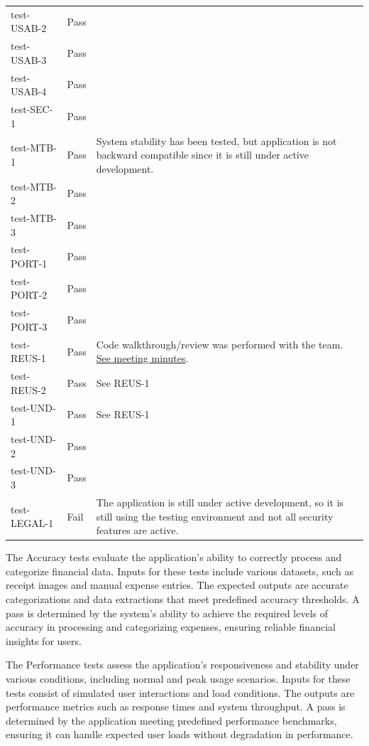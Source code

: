 \documentclass[12pt, titlepage]{article}
\begin{document}
\begin{longtable}{>{\centering\arraybackslash}p{} >{\centering\arraybackslash}p{} >{\centering\arraybackslash}p{}}
    test-USAB-2 & Pass &  \\
    test-USAB-3 & Pass &  \\
    test-USAB-4 & Pass &  \\
    \midrule
    test-SEC-1 & Pass &  \\
    \midrule
    test-MTB-1 & Pass & System stability has been tested, but application is not
    backward compatible since it is still under active development. \\
    test-MTB-2 & Pass &  \\
    test-MTB-3 & Pass &  \\
    \midrule
    test-PORT-1 & Pass &  \\
    test-PORT-2 & Pass &  \\
    test-PORT-3 & Pass &  \\
    \midrule
    test-REUS-1 & Pass & Code walkthrough/review was performed with the team.
    \href{https://github.com/PlutosCapstone/Plutos/issues/256}{See meeting
    minutes}. \\
    test-REUS-2 & Pass & See REUS-1 \\
    \midrule
    test-UND-1 & Pass & See REUS-1 \\
    test-UND-2 & Pass &  \\
    test-UND-3 & Pass &  \\
    \midrule
    test-LEGAL-1 & Fail & The application is still under active development, so
    it is still using the testing environment and not all security features are
    active. \\
    \bottomrule
\end{longtable}

The Accuracy tests evaluate the application's ability to correctly process and categorize 
financial data. Inputs for these tests include various datasets, such as receipt images 
and manual expense entries. The expected outputs are accurate categorizations and data 
extractions that meet predefined accuracy thresholds. A pass is determined by the 
system's ability to achieve the required levels of accuracy in processing and 
categorizing expenses, ensuring reliable financial insights for users.

The Performance tests assess the application's responsiveness and stability under 
various conditions, including normal and peak usage scenarios. Inputs for these tests 
consist of simulated user interactions and load conditions. The outputs are performance 
metrics such as response times and system throughput. A pass is determined by the 
application meeting predefined performance benchmarks, ensuring it can handle expected 
user loads without degradation in performance.
\end{document}
